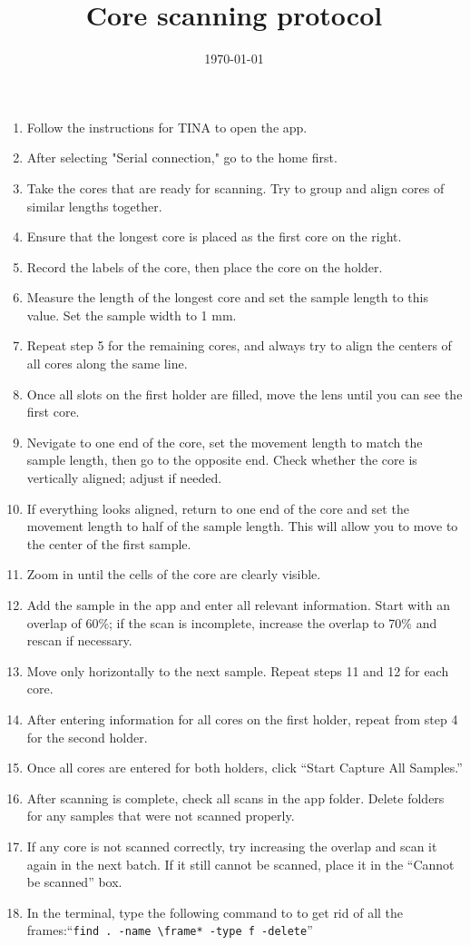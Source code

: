 \documentclass[11pt,letter]{article}
\begin{document}
\title{Core scanning protocol} 
\date{\today}
\maketitle

\setlength{\parindent}{0pt}
\setlength{\parskip}{3pt}
\begin{enumerate}
\item Follow the instructions for TINA to open the app.
\item After selecting "Serial connection," go to the home first.
\item Take the cores that are ready for scanning. Try to group and align cores of similar lengths together.
\item Ensure that the longest core is placed as the first core on the right.
\item Record the labels of the core, then place the core on the holder.
\item Measure the length of the longest core and set the sample length to this value. Set the sample width to 1 mm.
\item Repeat step 5 for the remaining cores, and always try to align the centers of all cores along the same line.
\item Once all slots on the first holder are filled, move the lens until you can see the first core.
\item Nevigate to one end of the core, set the movement length to match the sample length, then go to the opposite end. Check whether the core is vertically aligned; adjust if needed.
\item If everything looks aligned, return to one end of the core and set the movement length to half of the sample length. This will allow you to move to the center of the first sample.
\item Zoom in until the cells of the core are clearly visible.
\item Add the sample in the app and enter all relevant information. Start with an overlap of 60\%; if the scan is incomplete, increase the overlap to 70\% and rescan if necessary.
\item Move only horizontally to the next sample. Repeat steps 11 and 12 for each core.
\item After entering information for all cores on the first holder, repeat from step 4 for the second holder.
\item Once all cores are entered for both holders, click “Start Capture All Samples.”
\item After scanning is complete, check all scans in the app folder. Delete folders for any samples that were not scanned properly.
\item If any core is not scanned correctly, try increasing the overlap and scan it again in the next batch. If it still cannot be scanned, place it in the “Cannot be scanned” box.
\item In the terminal, type the following command to to get rid of all the frames:``\texttt{find . -name \textbackslash frame* -type f -delete}''
	\end{enumerate}
\end{document}
